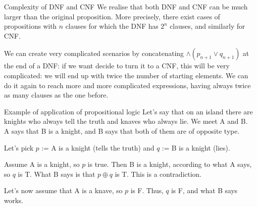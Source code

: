 \documentclass{article}
\begin{document}
\begin{parag}{Complexity of DNF and CNF}
    We realise that both DNF and CNF can be much larger than the original proposition. More precisely, there exist cases of propositions with $n$ clauses for which the DNF has $2^n$ clauses, and similarly for CNF. 

    We can create very complicated scenarios by concatenating $\land \left(p_{n+1} \lor q_{n+1}\right)$ at the end of a DNF: if we want decide to turn it to a CNF, this will be very complicated: we will end up with twice the number of starting elements. We can do it again to reach more and more complicated expressions, having always twice as many clauses as the one before.
\end{parag}

\begin{parag}{Example of application of propositional logic}
    Let's say that on an island there are knights who always tell the truth and knaves who always lie. We meet A and B. A says that B is a knight, and B says that both of them are of opposite type.

    Let's pick $p$ := A is a knight (tells the truth) and $q$ := B is a knight (lies).

    Assume A is a knight, so $p$ is true. Then B is a knight, according to what A says, so $q$ is T. What B says is that $p \oplus q$ is T. This is a contradiction.

    Let's now assume that A is a knave, so $p$ is F. Thus, $q$ is F, and what B says works.
\end{parag}
\end{document}
